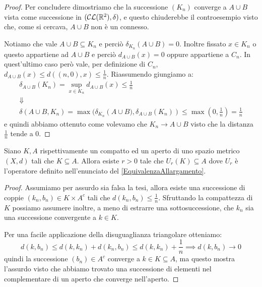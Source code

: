 \begin{proof}
	Per concludere dimostriamo che la successione $(K_n)$ converge a $A\cup B$ vista come successione in $(\mathcal{CL}(\mathbb R^2),\delta)$, e questo chiuderebbe il controesempio visto che, come si cercava, $A\cup B$ non è un connesso.
	
	Notiamo che vale $A\cup B\subseteq K_n$ e perciò $\delta_{K_n}(A\cup B)=0$. 
	Inoltre fissato $x\in K_n$ o questo appartiene ad $A\cup B$ e perciò $d_{A\cup B}(x)=0$ oppure appartiene a $C_n$. In quest'ultimo caso però vale, per definizione di $C_n$, $d_{A\cup B}(x)\le d\left((n,0),x\right)\le \frac 1n$. Riassumendo giungiamo a:
	\begin{gather*}
		\delta_{A\cup B}(K_n)=\sup_{x\in K_n} d_{A\cup B}(x)\le \frac 1n \\
		\Downarrow \\
		\delta(A\cup B,K_n)=\max(\delta_{K_n}\left(A\cup B),\delta_{A\cup B}(K_n)\right)\le \max\left(0,\frac1n\right)=\frac 1n
	\end{gather*}
	e quindi abbiamo ottenuto come volevamo che $K_n\to A\cup B$ visto che la distanza $\frac 1n$ tende a $0$.
\end{proof}

\begin{lemma}\label{CompattoInAperto}
	Siano $K,A$ rispettivamente un compatto ed un aperto di uno spazio metrico $(X,d)$ tali che $K\subseteq A$. Allora esiste $r>0$ tale che $U_r(K)\subseteq A$ dove $U_r$ è l'operatore definito nell'enunciato del \cref{EquivalenzaAllargamento}.
\end{lemma}
\begin{proof}
	Assumiamo per assurdo sia falsa la tesi, allora esiste una successione di coppie $(k_n,b_n)\in K\times A^c$ tali che $d(k_n,b_n)\le \frac 1n$.
	Sfruttando la compattezza di $K$ possiamo assumere inoltre, a meno di estrarre una sottosuccessione, che $k_n$ sia una successione convergente a $k\in K$.
	
	Per una facile applicazione della disuguaglianza triangolare otteniamo:
	\begin{equation}
		d(k,b_n)\le d(k,k_n)+d(k_n,b_n)\le d(k,k_n)+\frac 1n \implies d(k,b_n)\to 0
	\end{equation}
	quindi la successione $(b_n)\in A^c$ converge a $k\in K\subseteq A$, ma questo mostra l'assurdo visto che abbiamo trovato una successione di elementi nel complementare di un aperto che converge nell'aperto.

\end{proof}



